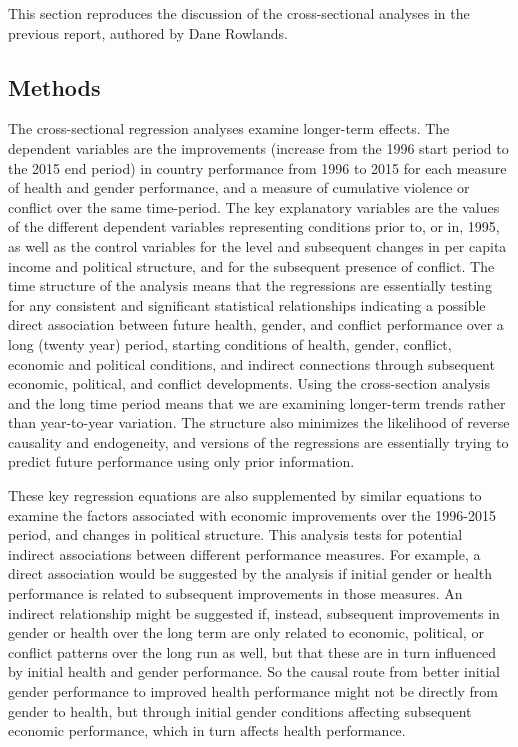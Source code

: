 \documentclass[12pt]{article}
\begin{document}
This section reproduces the discussion of the cross-sectional analyses in the previous report, authored by Dane Rowlands.

\subsection{Methods}

The cross-sectional regression analyses examine longer-term effects.
The dependent variables are the improvements (increase from the 1996 start period to the 2015 end period) in country performance from 1996 to 2015 for each measure of health and gender performance, and a measure of cumulative violence or conflict over the same time-period.
The key explanatory variables are the values of the different dependent variables representing conditions prior to, or in, 1995, as well as the control variables for the level and subsequent changes in per capita income and political structure, and for the subsequent presence of conflict. The time structure of the analysis means that the regressions are essentially testing for any consistent and significant statistical relationships indicating a possible direct association between future health, gender, and conflict performance over a long (twenty year) period, starting conditions of health, gender, conflict, economic and political conditions, and indirect connections through subsequent economic, political, and conflict developments. Using the cross-section analysis and the long time period means that we are examining longer-term trends rather than year-to-year variation. The structure also minimizes the likelihood of reverse causality and endogeneity, and versions of the regressions are essentially trying to predict future performance using only prior information.

These key regression equations are also supplemented by similar equations to examine the factors associated with economic improvements over the 1996-2015 period, and changes in political structure. This analysis tests for potential indirect associations between different performance measures. For example, a direct association would be suggested by the analysis if initial gender or health performance is related to subsequent improvements in those measures. An indirect relationship might be suggested if, instead, subsequent improvements in gender or health over the long term are only related to economic, political, or conflict patterns over the long run as well, but that these are in turn influenced by initial health and gender performance. So the causal route from better initial gender performance to improved health performance might not be directly from gender to health, but through initial gender conditions affecting subsequent economic performance, which in turn affects health performance.
\end{document}
